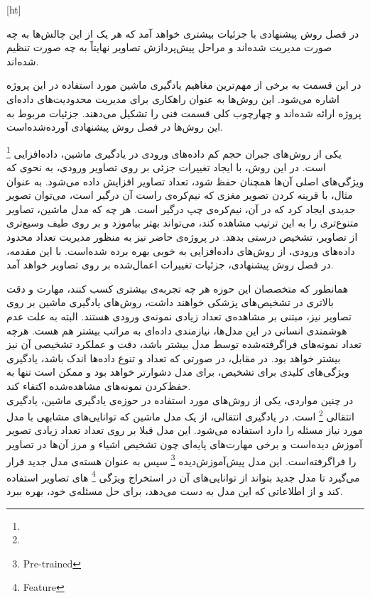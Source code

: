[ht]


در فصل روش پیشنهادی با جزئیات بیشتری خواهد آمد که هر یک از این چالش‌ها به چه صورت مدیریت شده‌اند و مراحل پیش‌پردازش تصاویر نهایتاً به چه صورت تنظیم شده‌اند.


در این قسمت به برخی از مهم‌ترین مغاهیم یادگیری ماشین مورد استفاده در این پروژه اشاره می‌شود.
این روش‌ها به عنوان راهکاری برای مدیریت محدودیت‌های داده‌ای پروژه ارائه شده‌اند و چهارچوب کلی قسمت فنی را تشکیل می‌دهند.
جزئیات مربوط به این روش‌ها در فصل روش پیشنهادی آورده‌شده‌است.


یکی از روش‌های جبران حجم کم داده‌های ورودی در یادگیری ماشین، داده‌افزایی
\footnote{}
 است.
در این روش، با ایجاد تغییرات جزئی بر روی تصاویر ورودی، به نحوی که ویژگی‌های اصلی آن‌ها همچنان حفظ شود، تعداد تصاویر افزایش داده می‌شود.
به عنوان مثال، با قرینه کردن تصویر مغزی که نیم‌کره‌ی راست آن درگیر است، می‌‌توان تصویر جدیدی ایجاد کرد که در آن، نیم‌کره‌ی چپ درگیر است.
هر چه که مدل ماشین، تصاویر متنوع‌تری را به این ترتیب مشاهده کند، می‌تواند بهتر بیاموزد و بر روی طیف وسیع‌تری از تصاویر، تشخیص درستی بدهد.
در پروژه‌ی حاضر نیز به منظور مدیریت تعداد محدود داده‌های ورودی، از روش‌های داده‌افزایی به خوبی بهره برده شده‌است.
با این مقدمه، در فصل روش پیشنهادی، جزئیات تغییرات اعمال‌شده بر روی تصاویر خواهد آمد.


همانطور که متخصصان این حوزه هر چه تجربه‌ی بیشتری کسب کنند، مهارت و دقت بالاتری در تشخیص‌های پزشکی خواهند داشت،
روش‌های یادگیری ماشین بر روی تصاویر نیز، مبتنی بر مشاهده‌ی تعداد زیادی نمونه‌ی ورودی هستند.
البته به علت عدم هوشمندی انسانی در این مدل‌ها، نیازمندی داده‌ای به مراتب بیشتر هم هست.
هرچه تعداد نمونه‌های فراگرفته‌شده توسط مدل بیشتر باشد، دقت و عملکرد تشخیصی آن نیز بیشتر خواهد بود.
در مقابل، در صورتی که تعداد و تنوع داده‌ها اندک باشد، یادگیری ویژگی‌های کلیدی برای تشخیص، برای مدل دشوارتر خواهد بود و ممکن است تنها به حفظ‌کردن نمونه‌های مشاهده‌شده اکتفاء کند.\\

در چنین مواردی، یکی از روش‌های مورد استفاده در حوزه‌ی یادگیری ماشین، یادگیری انتقالی
\footnote{}
 است.
در یادگیری انتقالی، از یک مدل ماشین که توانایی‌های مشابهی با مدل مورد نیاز مسئله را دارد
استفاده می‌شود.
این مدل قبلا بر روی تعداد تعداد زیادی تصویر آموزش دیده‌است و برخی مهارت‌های پایه‌ای چون تشخیص اشیاء و مرز آن‌ها در تصاویر را فراگرفته‌است.
این مدل پیش‌آموزش‌دیده
\footnote{Pre-trained}
سپس
به عنوان هسته‌ی مدل جدید قرار می‌گیرد تا مدل جدید بتواند از توانایی‌های آن در استخراج ویژگی
\footnote{Feature}
های تصاویر استفاده کند 
و از اطلاعاتی که این مدل به دست می‌دهد، برای حل مسئله‌ی خود، بهره ببرد.\\

